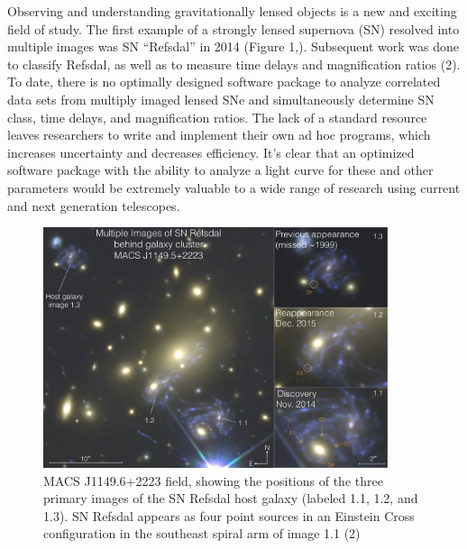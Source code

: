 \thispagestyle{fancy}
\lhead{}
\rhead{}
\renewcommand{\headrulewidth}{1pt}
\renewcommand{\footrulewidth}{0pt}
\newcommand{\packageName}{\textit{SNTD}}
\fancyfoot[C]{}

\pagestyle{fancy}

Observing and understanding gravitationally lensed objects is a new and exciting field of study. The first example of a strongly lensed supernova (SN) resolved into multiple images was SN ``Refsdal'' in 2014 (Figure 1,). Subsequent work was done to classify Refsdal, as well as to measure time delays and magnification ratios (2). To date, there is no optimally designed software package to analyze correlated data sets from multiply imaged lensed SNe and simultaneously determine SN class, time delays, and magnification ratios. The lack of a standard resource leaves researchers to write and implement their own ad hoc programs, which increases uncertainty and decreases efficiency. It's clear that an optimized software package with the ability to analyze a light curve for these and other parameters would be extremely valuable to a wide range of research using current and next generation telescopes. 
\begin{figure}[h]
\centering
\includegraphics[width=0.9\textwidth]{refsdal_rodney.pdf}
\caption{MACS J1149.6+2223 field, showing the positions of the three primary images of the SN Refsdal host galaxy (labeled 1.1, 1.2, and 1.3). SN Refsdal appears as four point sources in an Einstein Cross configuration in the southeast spiral arm of image 1.1 (2)}
\end{figure}


